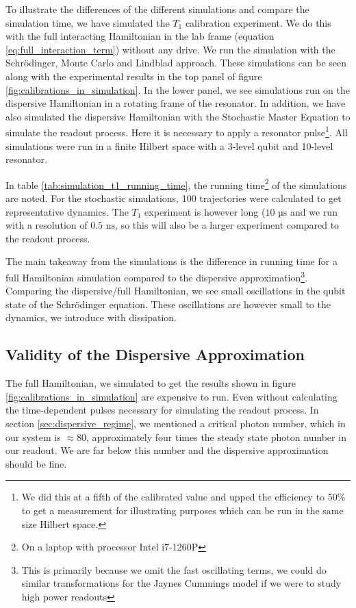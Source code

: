 To illustrate the differences of the different simulations and compare the simulation time, we have simulated the $T_1$ calibration experiment. We do this with the full interacting Hamiltonian in the lab frame (equation \ref{eq:full_interaction_term}) without any drive. We run the simulation with the Schrödinger, Monte Carlo and Lindblad approach. These simulations can be seen along with the experimental results in the top panel of figure \ref{fig:calibrations_in_simulation}. In the lower panel, we see simulations run on the dispersive Hamiltonian in a rotating frame of the resonator. In addition, we have also simulated the dispersive Hamiltonian with the Stochastic Master Equation to simulate the readout process. Here it is necessary to apply a resonator pulse\footnote{We did this at a fifth of the calibrated value and upped the efficiency to $50\%$ to get a measurement for illustrating purposes which can be run in the same size Hilbert space.}. All simulations were run in a finite Hilbert space with a 3-level qubit and 10-level resonator.

In table \ref{tab:simulation_t1_running_time}, the running time\footnote{On a laptop with processor Intel i7-1260P} of the simulations are noted. For the stochastic simulations, 100 trajectories were calculated to get representative dynamics. The $T_1$ experiment is however long ($10 \text{ µs}$ and we run with a resolution of $0.5 \text{ ns}$, so this will also be a larger experiment compared to the readout process.

The main takeaway from the simulations is the difference in running time for a full Hamiltonian simulation compared to the dispersive approximation\footnote{This is primarily because we omit the fast oscillating terms, we could do similar transformations for the Jaynes Cummings model if we were to study high power readouts}. Comparing the dispersive/full Hamiltonian, we see small oscillations in the qubit state of the Schrödinger equation. These oscillations are however small to the dynamics, we introduce with dissipation. 

\subsection{Validity of the Dispersive Approximation}
The full Hamiltonian, we simulated to get the results shown in figure \ref{fig:calibrations_in_simulation} are expensive to run. Even without calculating the time-dependent pulses necessary for simulating the readout process. In section \ref{sec:dispersive_regime}, we mentioned a critical photon number, which in our system is $\approx 80$, approximately four times the steady state photon number in our readout. We are far below this number and the dispersive approximation should be fine.

